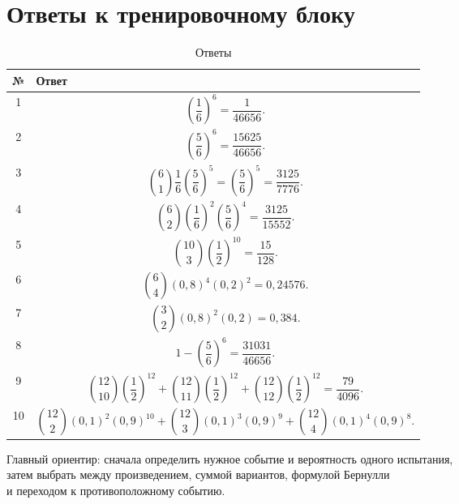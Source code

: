 \documentclass[a4paper,12pt]{article}
\begin{document}
\newpage

\section*{\color{darkaccent}Ответы к тренировочному блоку}

\renewcommand{\arraystretch}{1.5}

\begin{table}[h!]
\centering
\caption{Ответы}
\begin{tabularx}{\linewidth}{@{}cX@{}}
\toprule
\textbf{№} & \textbf{Ответ} \\
\midrule

1 &
\[
\left(\frac16\right)^6
=
\frac1{46656}.
\]
\\

2 &
\[
\left(\frac56\right)^6
=
\frac{15625}{46656}.
\]
\\

3 &
\[
\binom61\frac16\left(\frac56\right)^5
=
\left(\frac56\right)^5
=
\frac{3125}{7776}.
\]
\\

4 &
\[
\binom62
\left(\frac16\right)^2
\left(\frac56\right)^4
=
\frac{3125}{15552}.
\]
\\

5 &
\[
\binom{10}{3}
\left(\frac12\right)^{10}
=
\frac{15}{128}.
\]
\\

6 &
\[
\binom64
(0{,}8)^4(0{,}2)^2
=
0{,}24576.
\]
\\

7 &
\[
\binom32
(0{,}8)^2(0{,}2)
=
0{,}384.
\]
\\

8 &
\[
1-\left(\frac56\right)^6
=
\frac{31031}{46656}.
\]
\\

9 &
\[
\binom{12}{10}
\left(\frac12\right)^{12}
+
\binom{12}{11}
\left(\frac12\right)^{12}
+
\binom{12}{12}
\left(\frac12\right)^{12}
=
\frac{79}{4096}.
\]
\\

10 &
\[
\binom{12}{2}(0{,}1)^2(0{,}9)^{10}
+
\binom{12}{3}(0{,}1)^3(0{,}9)^9
+
\binom{12}{4}(0{,}1)^4(0{,}9)^8.
\]
\\

\bottomrule
\end{tabularx}
\end{table}

\vfill

\begin{center}
{\small\color{softgray}
Главный ориентир: сначала определить нужное событие и вероятность одного испытания,\\
затем выбрать между произведением, суммой вариантов, формулой Бернулли\\
и переходом к противоположному событию.}
\end{center}
\end{document}
